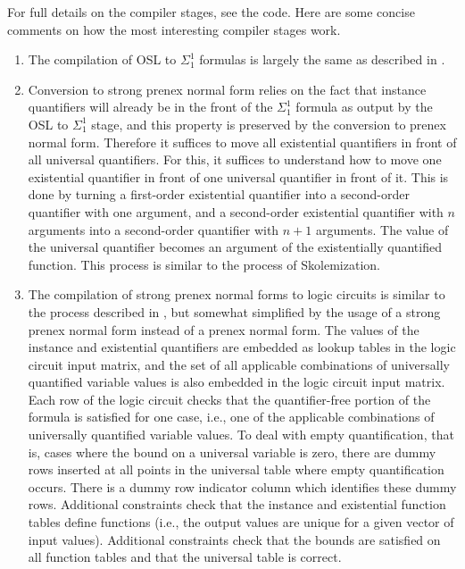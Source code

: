 \documentclass[11pt]{article}
\begin{document}
For full details on the compiler stages, see the code. \cite{osl-github} Here are some concise comments on how the most interesting compiler stages work.

\begin{enumerate}
	\item The compilation of OSL to $\Sigma^1_1$ formulas is largely the same as described in \cite{osl-paper}. 
	\item Conversion to strong prenex normal form relies on the fact that instance quantifiers will already be in the front of the $\Sigma^1_1$ formula as output by the OSL to $\Sigma^1_1$ stage, and this property is preserved by the conversion to prenex normal form. Therefore it suffices to move all existential quantifiers in front of all universal quantifiers. For this, it suffices to understand how to move one existential quantifier in front of one universal quantifier in front of it. This is done by turning a first-order existential quantifier into a second-order quantifier with one argument, and a second-order existential quantifier with $n$ arguments into a second-order quantifier with $n+1$ arguments. The value of the universal quantifier becomes an argument of the existentially quantified function. This process is similar to the process of Skolemization.
	\item The compilation of strong prenex normal forms to logic circuits is similar to the process described in \cite{sigma11-poly-bounds}, but somewhat simplified by the usage of a strong prenex normal form instead of a prenex normal form. The values of the instance and existential quantifiers are embedded as lookup tables in the logic circuit input matrix, and the set of all applicable combinations of universally quantified variable values is also embedded in the logic circuit input matrix. Each row of the logic circuit checks that the quantifier-free portion of the formula is satisfied for one case, i.e., one of the applicable combinations of universally quantified variable values. To deal with empty quantification, that is, cases where the bound on a universal variable is zero, there are dummy rows inserted at all points in the universal table where empty quantification occurs. There is a dummy row indicator column which identifies these dummy rows. Additional constraints check that the instance and existential function tables define functions (i.e., the output values are unique for a given vector of input values). Additional constraints check that the bounds are satisfied on all function tables and that the universal table is correct.

\end{enumerate}
\end{document}
